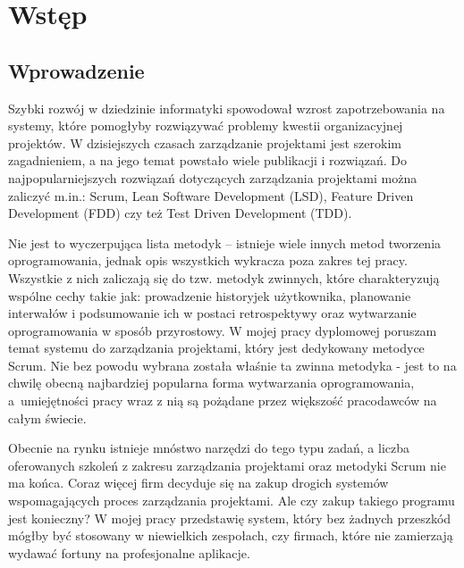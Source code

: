 \chapter{Wstęp}
\section{Wprowadzenie}
Szybki rozwój w dziedzinie informatyki spowodował wzrost zapotrzebowania na systemy, które pomogłyby rozwiązywać problemy kwestii organizacyjnej projektów. W dzisiejszych czasach zarządzanie projektami jest szerokim zagadnieniem, a na jego temat powstało wiele publikacji i rozwiązań. Do najpopularniejszych rozwiązań dotyczących zarządzania projektami można zaliczyć m.in.: Scrum, Lean Software Development (LSD), Feature Driven Development (FDD) czy też Test Driven Development (TDD). 

Nie jest to wyczerpująca lista metodyk -- istnieje wiele innych metod tworzenia oprogramowania, jednak opis wszystkich wykracza poza zakres tej pracy. Wszystkie z nich zaliczają się do tzw. metodyk zwinnych, które charakteryzują wspólne cechy takie jak: prowadzenie historyjek użytkownika, planowanie interwałów i podsumowanie ich w postaci retrospektywy oraz wytwarzanie oprogramowania w sposób przyrostowy. W mojej pracy dyplomowej poruszam temat systemu do zarządzania projektami, który jest dedykowany metodyce Scrum. Nie bez powodu wybrana została właśnie ta zwinna metodyka - jest to na chwilę obecną najbardziej popularna forma wytwarzania oprogramowania, a~umiejętności pracy wraz z nią są pożądane przez większość pracodawców na całym świecie. 

Obecnie na rynku istnieje mnóstwo narzędzi do tego typu zadań, a liczba oferowanych szkoleń z zakresu zarządzania projektami oraz metodyki Scrum nie ma końca. Coraz więcej firm decyduje się na zakup drogich systemów wspomagających proces zarządzania projektami. Ale czy zakup takiego programu jest konieczny? W mojej pracy przedstawię system, który bez żadnych przeszkód mógłby być stosowany w niewielkich zespołach, czy firmach, które nie zamierzają wydawać fortuny na profesjonalne aplikacje.

